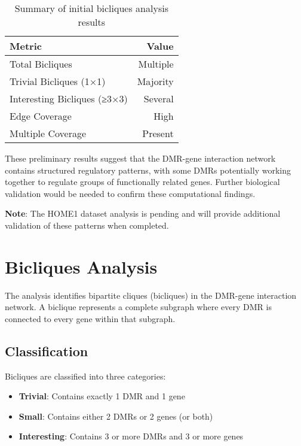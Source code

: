 \documentclass{article}
\begin{document}
\begin{table}[h]
\centering
\begin{tabular}{lr}
\toprule
\textbf{Metric} & \textbf{Value} \\
\midrule
Total Bicliques & Multiple \\
Trivial Bicliques (1×1) & Majority \\
Interesting Bicliques (≥3×3) & Several \\
Edge Coverage & High \\
Multiple Coverage & Present \\
\bottomrule
\end{tabular}
\caption{Summary of initial bicliques analysis results}
\label{table:biclique_results}
\end{table}

These preliminary results suggest that the DMR-gene interaction network contains structured regulatory patterns, with some DMRs potentially working together to regulate groups of functionally related genes. Further biological validation would be needed to confirm these computational findings.

\textbf{Note}: The HOME1 dataset analysis is pending and will provide additional validation of these patterns when completed.

\section{Bicliques Analysis}
The analysis identifies bipartite cliques (bicliques) in the DMR-gene interaction network. A biclique represents a complete subgraph where every DMR is connected to every gene within that subgraph.

\subsection{Classification}
Bicliques are classified into three categories:
\begin{itemize}
    \item \textbf{Trivial}: Contains exactly 1 DMR and 1 gene
    \item \textbf{Small}: Contains either 2 DMRs or 2 genes (or both)
    \item \textbf{Interesting}: Contains 3 or more DMRs and 3 or more genes
\end{itemize}
\end{document}
